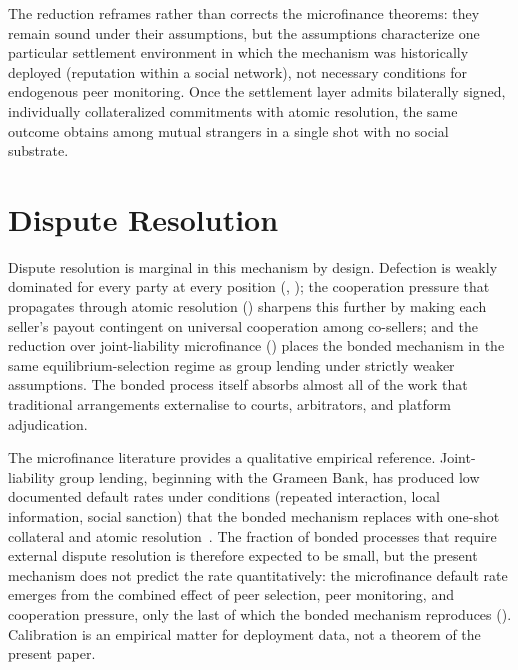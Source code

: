 \documentclass[11pt,a4paper]{article}
\theoremstyle{definition}
\theoremstyle{remark}
\begin{document}
The reduction reframes rather than corrects the microfinance theorems:
they remain sound under their assumptions, but the assumptions
characterize one particular settlement environment in which the
mechanism was historically deployed (reputation within a social
network), not necessary conditions for endogenous peer monitoring.
Once the settlement layer admits bilaterally signed, individually
collateralized commitments with atomic resolution, the same outcome
obtains among mutual strangers in a single shot with no social
substrate.

\section{Dispute Resolution}
\label{sec:dispute}

Dispute resolution is marginal in this mechanism by design.
Defection is weakly dominated for every party at every position
(, ); the
cooperation pressure that propagates through atomic resolution
() sharpens this further by
making each seller's payout contingent on universal cooperation
among co-sellers; and the reduction over joint-liability
microfinance () places the
bonded mechanism in the same equilibrium-selection regime as
group lending under strictly weaker assumptions. The bonded
process itself absorbs almost all of the work that traditional
arrangements externalise to courts, arbitrators, and platform
adjudication.

The microfinance literature provides a qualitative empirical
reference. Joint-liability group lending, beginning with the
Grameen Bank, has produced low documented default rates under
conditions (repeated interaction, local information, social
sanction) that the bonded mechanism replaces with one-shot
collateral and atomic resolution~\citep{yunus1999, ghatak1999}.
The fraction of bonded processes that require external dispute
resolution is therefore expected to be small, but the present
mechanism does not predict the rate quantitatively: the
microfinance default rate emerges from the combined effect of
peer selection, peer monitoring, and cooperation pressure, only
the last of which the bonded mechanism reproduces
(). Calibration is an
empirical matter for deployment data, not a theorem of the
present paper.
\end{document}
